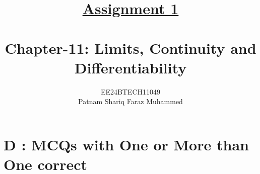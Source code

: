 \documentclass[journal,12pt,twocolumn]{IEEEtran}
\theoremstyle{remark}
\begin{document}


\title{{\uline{Assignment 1 \\ } \\}Chapter-11: Limits, Continuity and Differentiability}
\author{{EE24BTECH11049 \\ Patnam Shariq Faraz Muhammed}}


 
\maketitle
\newpage
\bigskip

\renewcommand{\thefigure}{\theenumi}
\renewcommand{\thetable}{\theenumi}

\section*{D : MCQs with One or More than One correct}
\end{document}
